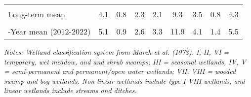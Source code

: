 \documentclass[
  12pt,
]{article}
\begin{document}
\begin{table}[!h]
{\begin{threeparttable}
\begin{tabular}[t]{>{\centering\arraybackslash}m{8em}cccccccc}
\cellcolor{gray!6}{\% Change from previous year} & \cellcolor{gray!6}{353.2\%} & \cellcolor{gray!6}{29.2\%} & \cellcolor{gray!6}{-11.2\%} & \cellcolor{gray!6}{179.8\%} & \cellcolor{gray!6}{149.7\%} & \cellcolor{gray!6}{12.9\%} & \cellcolor{gray!6}{173.8\%} & \cellcolor{gray!6}{47.1\%}\\
Long-term mean & 4.1 & 0.8 & 2.3 & 2.1 & 9.3 & 3.5 & 0.8 & 4.3\\
\cellcolor{gray!6}{\% Change from long-term mean} & \cellcolor{gray!6}{233.5\%} & \cellcolor{gray!6}{84.4\%} & \cellcolor{gray!6}{49.8\%} & \cellcolor{gray!6}{518.4\%} & \cellcolor{gray!6}{240.4\%} & \cellcolor{gray!6}{58.3\%} & \cellcolor{gray!6}{349.8\%} & \cellcolor{gray!6}{112.8\%}\\
10-Year mean (2012-2022) & 5.1 & 0.9 & 2.6 & 3.3 & 11.9 & 4.1 & 1.4 & 5.5\\
\bottomrule
\end{tabular}
\begin{tablenotes}
\small
\item \textit{Notes: Wetland classification system from March et al. (1973). 
      I, II, VI = temporary, wet meadow, and and shrub swamps; III = seasonal wetlands, IV, V = semi-permanent 
      and permanent/open water wetlands; VII, VIII = wooded swamp and bog wetlands. Non-linear wetlands include
      type I-VIII wetlands, and linear wetlands include streams and ditches.} 
\item 
\end{tablenotes}
\end{threeparttable}}
\end{table}

\newpage
\end{document}
